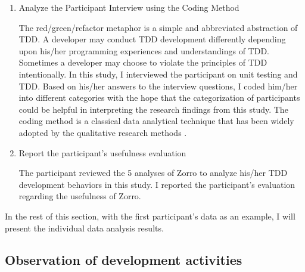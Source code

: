 \begin{enumerate}
\item Analyze the Participant Interview using the Coding Method

The red/green/refactor metaphor is a simple and abbreviated
abstraction of TDD. A developer may conduct TDD development
differently depending upon his/her programming experiences and
understandings of TDD. Sometimes a developer may choose to violate
the principles of TDD intentionally. In this study, I interviewed
the participant on unit testing and TDD. Based on his/her answers 
to the interview questions, I coded him/her into different categories 
with the hope that the categorization of participants could be helpful in
interpreting the research findings from this study. The coding method
is a classical data analytical technique that has been widely adopted
by the qualitative research methods \cite{Creswell:03,GroundedTheory}.

\item Report the participant's usefulness evaluation

The participant reviewed the 5 analyses of Zorro to analyze his/her
TDD development behaviors in this study. I reported the participant's
evaluation regarding the usefulness of Zorro.

\end{enumerate}

In the rest of this section, with the first participant's data as an
example, I will present the individual data analysis results.

\subsection{Observation of development activities}
\label{subsec:DevelopmentActivityObservation}

